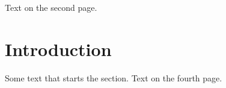 \documentclass{article}
\begin{document}
\tableofcontents
\newpage
Text on the second page.
\newpage
\section{Introduction}
Some text that starts the section.
\newpage
Text on the fourth page.
\end{document}
